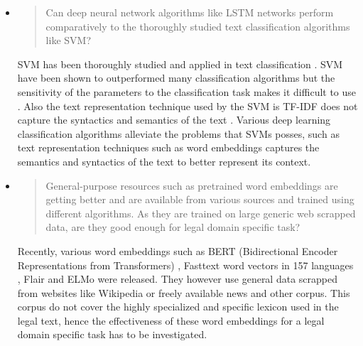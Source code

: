 \begin{itemize}
    \item 
        \begin{quote}
        Can deep neural network algorithms like \gls{LSTM} networks perform comparatively to the thoroughly studied text classification algorithms like \gls{SVM}?
        \end{quote}
        
        \gls{SVM} has been thoroughly studied and applied in text classification \cite{Chau:2008:MLA:1322568.1322643, Fan:2006:ITM:1217741.1217764, Forman:2008:BFS:1458082.1458119,10.1007/BFb0026683,Sebastiani:2002:MLA:505282.505283,oro15675}. \gls{SVM} have been shown  to outperformed many classification algorithms but the sensitivity of the parameters to the classification task makes it difficult to use \cite{10.1007/978-0-387-34747-9_18}. Also the text representation technique used by the \gls{SVM} is \gls{TF-IDF} does not capture the syntactics and semantics of the text \cite{Corr_a_J_nior_2017}. Various deep learning classification algorithms alleviate the problems that \glspl{SVM} posses, such as text representation techniques such as word embeddings captures the semantics and syntactics of the text to better represent its context.
        
        
    \item 
    \begin{quote}
        General-purpose resources such as pretrained word embeddings are getting better and are available from various sources and trained using different algorithms. As they are trained on large generic web scrapped data, are they good enough for legal domain specific task?    
    \end{quote}
    Recently, various word embeddings such as BERT (Bidirectional Encoder Representations from Transformers) \cite{devlin2018bert}, Fasttext word vectors in 157 languages \cite{bojanowski2017enriching}, Flair \cite{akbik2018coling} and ELMo \cite{Peters:2018} were released. They however use general data scrapped from websites like Wikipedia or freely available news and other corpus. This corpus do not cover the highly specialized and specific lexicon used in the legal text, hence the effectiveness of these word embeddings for a legal domain specific task has to be investigated.
    

\end{itemize}
